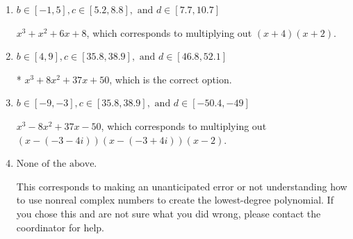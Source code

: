 \documentclass{extbook}[14pt]
\begin{document}
\begin{enumerate}
{\begin{enumerate}[label=\Alph*.]
$x^{3} + x^{2} +5 x + 6$, which corresponds to multiplying out $(x + 3)(x + 2)$.
\item \( b \in [-1, 5], c \in [5.2, 8.8], \text{ and } d \in [7.7, 10.7] \)

$x^{3} + x^{2} +6 x + 8$, which corresponds to multiplying out $(x + 4)(x + 2)$.
\item \( b \in [4, 9], c \in [35.8, 38.9], \text{ and } d \in [46.8, 52.1] \)

* $x^{3} +8 x^{2} +37 x + 50$, which is the correct option.
\item \( b \in [-9, -3], c \in [35.8, 38.9], \text{ and } d \in [-50.4, -49] \)

$x^{3} -8 x^{2} +37 x -50$, which corresponds to multiplying out $(x-(-3 - 4 i))(x-(-3 + 4 i))(x -2)$.
\item \( \text{None of the above.} \)

This corresponds to making an unanticipated error or not understanding how to use nonreal complex numbers to create the lowest-degree polynomial. If you chose this and are not sure what you did wrong, please contact the coordinator for help.
\end{enumerate}

}
\end{enumerate}
\end{document}
